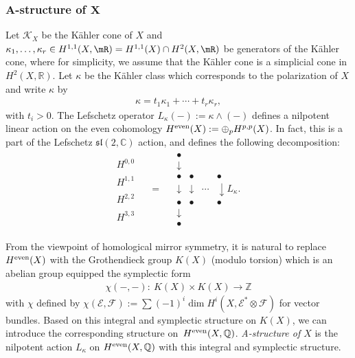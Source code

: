 \documentclass[pdftex]{sigma}
\numberwithin{equation}{section}
\begin{document}
\subsubsection[A-structure of $X$]{A-structure of $\boldsymbol{X}$} Let $\mathcal{K}_{X}$ be the K\"ahler cone of $X$ and $\kappa_{1},\dots,\kappa_{r}\in H^{1,1}(X,\mR)=H^{1,1}(X)\cap H^{2}(X,\mR)$ be ge\-nerators of the K\"ahler cone, where for simplicity, we assume that the K\"ahler cone is a simplicial cone in $H^{2}(X,\mathbb{R})$. Let $\kappa$ be the K\"ahler class which corresponds to the polarization of $X$ and write $\kappa$ by
\begin{gather*}
\kappa=t_{1}\kappa_{1}+\cdots+t_{r}\kappa_{r},
\end{gather*}
with $t_{i}>0$. The Lefschetz operator $L_{\kappa}(-):=\kappa\wedge(-)$ defines a nilpotent linear action on the even cohomology $H^{\rm even}(X):=\oplus_{p}H^{p,p}(X)$. In fact, this is a part of the Lefschetz $\mathfrak{sl}(2,\mathbb{C})$ action, and defines the following decomposition:
\begin{gather*}
\begin{matrix}H^{0,0}\\
\\
H^{1,1}\\
\\
H^{2,2}\\
\\
H^{3,3}
\end{matrix}\;\;\;\;=\;\;\;\;\begin{matrix}\bullet\\
\downarrow\\
\bullet & \bullet & & \bullet~~~~~\\
\downarrow & \downarrow & \cdots & \downarrow L_{\kappa}.\\
\bullet & \bullet & & \bullet~~~~~ \\
\downarrow\\
\bullet
\end{matrix}
\end{gather*}

From the viewpoint of homological mirror symmetry, it is natural to replace $H^{\rm even}(X)$ with the Grothendieck group $K(X)$ (modulo torsion) which is an abelian group equipped the symplectic form
\begin{gather*}
\chi(-,-)\colon \ K(X)\times K(X)\to\mathbb{Z}
\end{gather*}
with $\chi$ defined by $\chi(\mathcal{E},\mathcal{F}):=\sum(-1)^{i}\dim H^{i}(X,\mathcal{E}^{*}\otimes\mathcal{F})$ for vector bundles. Based on this integral and symplectic structure on $K(X)$, we can introduce the corresponding structure on~$H^{\rm even}(X,\mathbb{Q})$. \textit{A-structure of $X$} is the nilpotent action $L_{\kappa}$ on $H^{\rm even}(X,\mathbb{Q})$ with this integral and symplectic structure.
\end{document}

